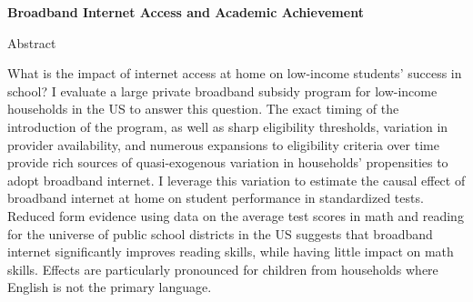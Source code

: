\documentclass[letterpaper,11pt]{article}
\begin{document}
\Large{\textbf{Broadband Internet Access and Academic Achievement}}

\small{ }

 \bigskip

Abstract

\medskip




What is the impact of internet access at home on low-income students' success in school? I evaluate a large private broadband subsidy program for low-income households in the US to answer this question. The exact timing of the introduction of the program, as well as sharp eligibility thresholds, variation in provider availability, and numerous expansions to eligibility criteria over time provide rich sources of quasi-exogenous variation in households' propensities to adopt broadband internet. I leverage this variation to estimate the causal effect of broadband internet at home on student performance in standardized tests. Reduced form evidence using data on the average test scores in math and reading for the universe of public school districts in the US suggests that broadband internet significantly improves reading skills, while having little impact on math skills. Effects are particularly pronounced for children from households where English is not the primary language.

\bigskip
\end{document}

